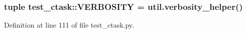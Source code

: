 \hypertarget{namespacetest__ctask_ae79de960cf6d3de15148c070e498fa04}{
\subsubsection[{\-V\-E\-R\-B\-O\-S\-I\-T\-Y}]{\setlength{\rightskip}{0pt plus 5cm}tuple {\bf test\-\_\-ctask\-::\-V\-E\-R\-B\-O\-S\-I\-T\-Y} = util.\-verbosity\-\_\-helper()}}
\label{namespacetest__ctask_ae79de960cf6d3de15148c070e498fa04}


\-Definition at line 111 of file test\-\_\-ctask.\-py.

